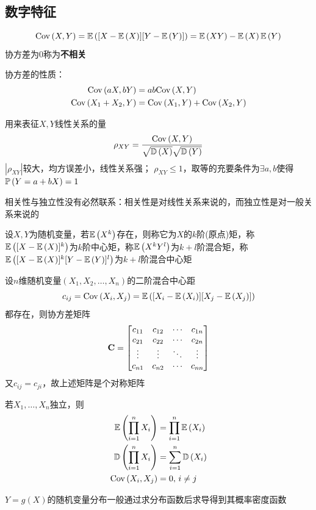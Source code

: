 \subsection{数字特征}
\begin{definition}[协方差]
\[\mathrm{Cov}\left(X,Y\right)=\mathbb{E}\left([X-\mathbb{E}\left(X\right)][Y-\mathbb{E}\left(Y\right)]\right)=\mathbb{E}\left(XY\right)-\mathbb{E}\left(X\right)\mathbb{E}\left(Y\right)\]
协方差为$0$称为\textbf{不相关}
\end{definition}
协方差的性质：
\[\begin{aligned}
\mathrm{Cov}\left(aX,bY\right)&=ab\mathrm{Cov}\left(X,Y\right)\\
\mathrm{Cov}\left(X_1+X_2,Y\right)&=\mathrm{Cov}\left(X_1,Y\right)+\mathrm{Cov}\left(X_2,Y\right)
\end{aligned}\]
\begin{definition}[相关系数]
用来表征$X,Y$线性关系的量
\[\rho_{XY}=\frac{\mathrm{Cov}\left(X,Y\right)}{\sqrt{\mathbb{D}\left(X\right)}\sqrt{\mathbb{D}\left(Y\right)}}\]
$|\rho_{XY}|$较大，均方误差小，线性关系强；
$\rho_{XY}\leq 1$，取等的充要条件为$\exists a,b$使得$\mathbb{P}\left(Y=a+bX\right)=1$
\end{definition}
相关性与独立性没有必然联系：相关性是对线性关系来说的，而独立性是对一般关系来说的
\begin{definition}[矩(moment)]
设$X,Y$为随机变量，若$\mathbb{E}\left(X^k\right)$存在，则称它为$X$的$k$阶(原点)矩，称$\mathbb{E}\left([X-\mathbb{E}\left(X\right)]^k\right)$为$k$阶中心矩，称$\mathbb{E}\left(X^kY^l\right)$为$k+l$阶混合矩，称$\mathbb{E}\left([X-\mathbb{E}\left(X\right)]^k[Y-\mathbb{E}\left(Y\right)]^l\right)$为$k+l$阶混合中心矩
\end{definition}
\begin{definition}[协方差矩阵]
设$n$维随机变量$(X_1,X_2,\ldots,X_n)$的二阶混合中心距
\[c_{ij}=\mathrm{Cov}\left(X_i,X_j\right)=\mathbb{E}\left([X_i-\mathbb{E}\left(X_i\right)][X_j-\mathbb{E}\left(X_j\right)]\right)\]
都存在，则协方差矩阵
\[\mathbf{C}=\begin{bmatrix}
c_{11}&c_{12}&\cdots&c_{1n}\\
c_{21}&c_{22}&\cdots&c_{2n}\\
\vdots&\vdots&\ddots&\vdots\\
c_{n1}&c_{n2}&\cdots&c_{nn}
\end{bmatrix}\]
又$c_{ij}=c_{ji}$，故上述矩阵是个对称矩阵
\end{definition}
\begin{theorem}
若$X_1,\ldots,X_n$独立，则
\[\begin{aligned}
\mathbb{E}\left(\prod_{i=1}^nX_i\right)&=\prod_{i=1}^n\mathbb{E}\left(X_i\right)\\
\mathbb{D}\left(\prod_{i=1}^nX_i\right)&=\sum_{i=1}^n\mathbb{D}\left(X_i\right)\\
\mathrm{Cov}\left(X_i,X_j\right)&=0,\,i\ne j
\end{aligned}\]
\end{theorem}
$Y=g(X)$的随机变量分布一般通过求分布函数后求导得到其概率密度函数